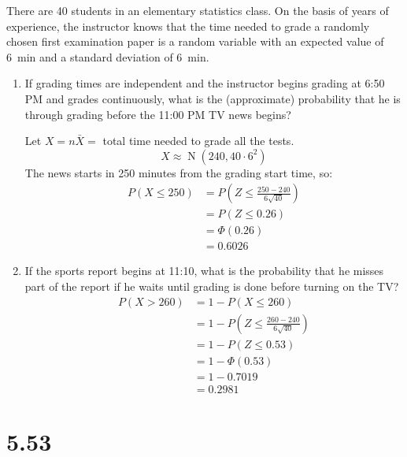 \documentclass[letterpaper,12pt,fleqn]{article}
\newcommand{\xb}{\bar{X}}
\renewcommand{\P}{\Phi}
\DeclareMathOperator{\nd}{N}
\begin{document}
There are 40 students in an elementary statistics class.  On the basis of years of experience, the instructor knows that the
time needed to grade a randomly chosen first examination paper is a random variable with an expected value of \SI{6}{min} and
a standard deviation of \SI{6}{min}.
\begin{enumerate}[label={\alph*)}]
\item If grading times are independent and the instructor begins grading at 6:50 PM and grades continuously, what is the
  (approximate) probability that he is through grading before the 11:00 PM TV news begins?

  Let \(X=n\xb=\) total time needed to grade all the tests.
  \[X\approx\nd(240,40\cdot6^2)\]
  The news starts in 250 minutes from the grading start time, so:
  \begin{align*}
    P(X\le250) &= P\left(Z\le\frac{250-240}{6\sqrt{40}}\right) \\
    &= P(Z\le0.26) \\
    &= \P(0.26) \\
    &= 0.6026
  \end{align*}
\item If the sports report begins at 11:10, what is the probability that he misses part of the report if he waits until
  grading is done before turning on the TV?
  \begin{align*}
    P(X>260) &= 1-P(X\le260) \\
    &= 1-P\left(Z\le\frac{260-240}{6\sqrt{40}}\right) \\
    &= 1-P(Z\le0.53) \\
    &= 1-\P(0.53) \\
    &= 1-0.7019 \\
    &= 0.2981
  \end{align*}
\end{enumerate}

\section*{5.53}
\end{document}
